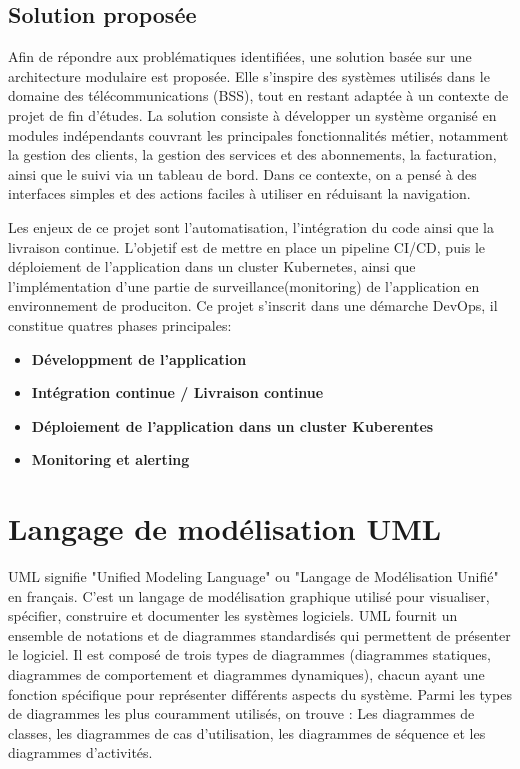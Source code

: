 \subsection{Solution proposée}
Afin de répondre aux problématiques identifiées, une solution basée sur une architecture modulaire est proposée. Elle s’inspire des systèmes utilisés dans le domaine des télécommunications (BSS), tout en restant adaptée à un contexte de projet de fin d’études.
\newline 
La solution consiste à développer un système organisé en modules indépendants couvrant les principales fonctionnalités métier, notamment la gestion des clients, la gestion des services et des abonnements, la facturation, ainsi que le suivi via un tableau de bord.
Dans ce contexte, on a pensé à des interfaces simples et des actions faciles à utiliser en réduisant la navigation.
\newline
\vspace{-0.5cm}

 Les enjeux de ce projet sont l'automatisation, l'intégration du code ainsi que la livraison continue.
 L'objetif est de mettre en place un pipeline CI/CD, puis le déploiement de l'application dans un cluster Kubernetes, ainsi que l'implémentation d'une partie de surveillance(monitoring) de l'application en environnement de produciton.
 Ce projet s'inscrit dans une démarche DevOps, il constitue quatres phases principales: 
 \begin{itemize}
    \item[•] \textbf{Développment de l'application}
    \item[•] \textbf {Intégration continue / Livraison continue}
    \item[•] \textbf{Déploiement de l'application dans un cluster Kuberentes}
    \item[•] \textbf{Monitoring et alerting}
 \end{itemize}

\section{Langage de modélisation UML}
UML signifie "Unified Modeling Language" ou "Langage de Modélisation Unifié" en français. C'est un langage de modélisation graphique utilisé pour visualiser, spécifier, construire et documenter les systèmes logiciels. UML fournit un ensemble de notations et de diagrammes standardisés qui permettent de présenter le logiciel.
\newline
Il est composé de trois types de diagrammes (diagrammes statiques, diagrammes de comportement et diagrammes dynamiques), chacun ayant une fonction spécifique pour représenter différents aspects du système. Parmi les types de diagrammes les plus couramment utilisés, on trouve : \newline
Les diagrammes de classes, les diagrammes de cas d'utilisation, les diagrammes de séquence et les diagrammes d'activités.

